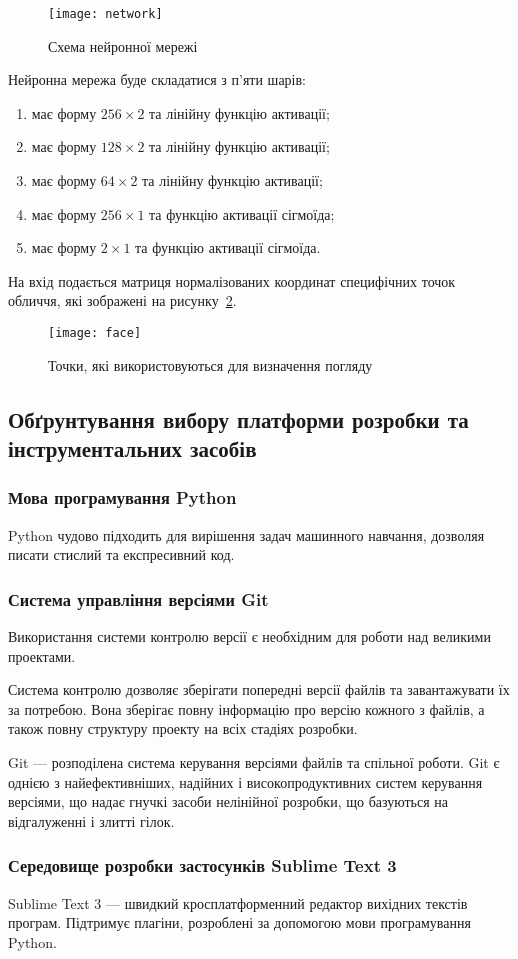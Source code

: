 \begin{figure}[H]
	\centering
	\texttt{[image: network]}
	\caption{Схема нейронної мережі}
	\label{fig:network}
\end{figure} 

Нейронна мережа буде складатися з п'яти шарів:
\begin{enumerate}[label={\arabic*-й ---}]
	\item має форму $256\times2$ та лінійну функцію активації; 
	\item має форму $128\times2$ та лінійну функцію активації; 
	\item має форму $64\times2$ та лінійну функцію активації; 
	\item має форму $256\times1$ та функцію активації сігмоїда; 
	\item має форму $2\times1$ та функцію активації сігмоїда. 
\end{enumerate}

На вхід подається матриця нормалізованих координат специфічних точок обличчя, які зображені на рисунку~\ref{fig:face}. 

\begin{figure}[H]
	\centering
	\texttt{[image: face]}
	\caption{Точки, які використовуються для визначення погляду}
	\label{fig:face}
\end{figure} 

\subsection{Обґрунтування вибору платформи розробки та інструментальних засобів}
\subsubsection{Мова програмування Python}
Python чудово підходить для вирішення задач машинного навчання, дозволяя писати стислий та експресивний код.

\subsubsection{Система управління версіями Git}
Використання системи контролю версії є необхідним для роботи над великими проектами.

Система контролю дозволяє зберігати попередні версії файлів та завантажувати їх за потребою. 
Вона зберігає повну інформацію про версію кожного з файлів, а також повну структуру проекту на всіх стадіях розробки.

Git --- розподілена система керування версіями файлів та спільної роботи. Git є однією з найефективніших, надійних і високопродуктивних систем керування версіями, що надає гнучкі засоби нелінійної розробки, що базуються на відгалуженні і злитті гілок.

\subsubsection{Середовище розробки застосунків Sublime Text 3}
Sublime Text 3 --- швидкий кросплатформенний редактор вихідних текстів програм. Підтримує плагіни, розроблені за допомогою мови програмування Python.
